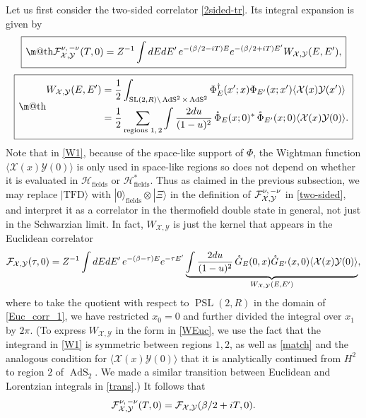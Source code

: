 \documentclass[12pt]{article}
\makeatletter
\newcommand{\be}{\begin{equation}}
\newcommand{\ee}{\end{equation}}
\newcommand*{\wideboxed}[1]{\setlength{\fboxsep}{1ex}%
  \fbox{\m@th$\displaystyle#1$}}
\newcommand*{\ket}[1]{|{#1}\rangle}
\newcommand*{\corr}[1]{\langle{#1}\rangle}
\newcommand{\calF}{\mathcal{F}}
\newcommand{\calH}{\mathcal{H}}
\newcommand{\calX}{\mathcal{X}}
\newcommand{\calY}{\mathcal{Y}}
\newcommand{\RR}{\mathbb{R}}
\DeclareMathOperator{\PSL}{PSL}
\DeclareMathOperator{\tSL}{\widetilde{\mathrm{SL}}}
\DeclareMathOperator{\tAdS}{\widetilde{AdS}}
\DeclareMathOperator{\HH}{H}
\newcommand{\bt}{\beta}
\newcommand{\rG}{\mathring{G}}
\newcommand{\ov}{\over}
\def\widetilde#1{#1}%
\def\HH{H}
\def\RR{R}
\makeatother
\begin{document}
Let us first consider the two-sided correlator \eqref{2sided-tr}. Its integral expansion is given by
\be \label{2sided_int}
\wideboxed{
\tensor*{\calF}{*^{\nu,\, -\nu}_{\calX,\calY}}(T,0)=Z^{-1}\int dE dE' \,e^{-(\bt/2-i T)E}e^{-(\bt/2+iT)E'} W_{\calX, \calY}(E,E'),
}
\ee
\be 
\wideboxed{\begin{aligned}\label{W1}
W_{\calX, \calY}(E,E')&= {1 \ov 2}\int_{\tSL(2,\RR)\backslash \tAdS^2 \times \tAdS^2}\Phi^{\dagger}_{E}(x'; x)\Phi_{E'}(x;x')\corr{\calX(x)\calY(x')}\\
&={1 \ov 2}\sum_{\text{regions $1,2$}}\int{2 du \ov (1-u)^2}\, \mathring{\Phi}_{E}(x;0)^*\, \mathring{\Phi}_{E'}(x;0)\corr{\calX(x)\calY(0)}.
\end{aligned}} 
\ee
Note that in \eqref{W1}, because of the space-like support of $\Phi$, the Wightman function $\corr{\calX(x)\calY(0)}$ is only used in space-like regions so does not depend on whether it is evaluated in $\calH_{\text{fields}}$ or $\calH_{\text{fields}}^*$. Thus as claimed in the previous subsection, we may replace $\ket{\text{TFD}}$ with $\ket{0}_{\text{fields}}\otimes \ket{\Xi}$ in the definition of $\tensor*{\calF}{*^{\nu,\, -\nu}_{\calX,\calY}}$ in \eqref{two-sided}, and interpret it as a correlator in the thermofield double state in general, not just in the Schwarzian limit. In fact, $W_{\calX, \calY}$ is just the kernel that appears in the Euclidean correlator
\be \label{WEuc}
\calF_{\calX, \calY}(\tau,0)=Z^{-1}\int dE dE'\, e^{-(\beta-\tau)E}e^{-\tau E'} \underbrace{\int {2du \ov (1-u)^2}\,\rG_E(0,x)\rG_{E'}(x,0)\corr{\calX(x)\calY(0)}}_{W_{\calX, \calY}(E,E')},
\ee
where to take the quotient with respect to $\PSL(2,\RR)$ in the domain of \eqref{Euc_corr_1}, we have restricted $x_0=0$ and further divided the integral over $x_1$ by $2\pi$. (To express $W_{\calX, \calY}$ in the form in \eqref{WEuc}, we use the fact that the integrand in \eqref{W1} is symmetric between regions $1,2$, as well as \eqref{match} and the analogous condition for $\corr{\calX(x)\calY(0)}$ that it is analytically continued from $\HH^2$ to region $2$ of $\tAdS_2$. We made a similar transition between Euclidean and Lorentzian integrals in \eqref{trans}.) It follows that
\be
\tensor*{\calF}{*^{\nu,\, -\nu}_{\calX,\calY}}(T,0)=\calF_{\calX, \calY}(\bt/2+i T,0).
\ee
\end{document}
